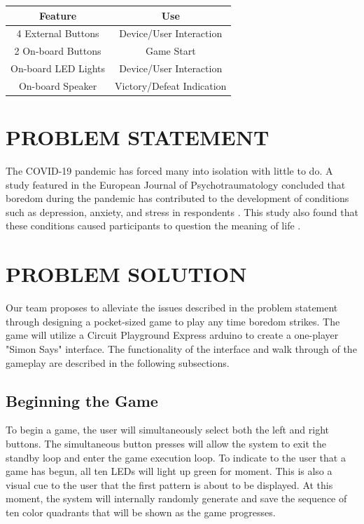 \documentclass[12pt]{article}
\begin{document}
\begin{center}
\begin{tabular}{|c|c|}
    \hline
    Feature & Use \\
    \hline
    \hline
    4 External Buttons & Device/User Interaction\\
    2 On-board Buttons & Game Start\\
    On-board LED Lights & Device/User Interaction\\
    On-board Speaker & Victory/Defeat Indication\\
    \hline
\end{tabular}
\end{center}


\section{PROBLEM STATEMENT}
The COVID-19 pandemic has forced many into isolation with little to do. A study featured in the European Journal of Psychotraumatology concluded that boredom during the pandemic has contributed to the development of conditions such as depression, anxiety, and stress in respondents \cite{Chao}. This study also found that these conditions caused participants to question the meaning of life \cite{Chao}. 

\section{PROBLEM SOLUTION}

Our team proposes to alleviate the issues described in the problem statement through designing a pocket-sized game to play any time boredom strikes. The game will utilize a Circuit Playground Express arduino to create a one-player "Simon Says" interface. The functionality of the interface and walk through of the gameplay are described in the following subsections.

\subsection{Beginning the Game}
To begin a game, the user will simultaneously select both the left and right buttons. The simultaneous button presses will allow the system to exit the standby loop and enter the game execution loop. To indicate to the user that a game has begun, all ten LEDs will light up green for moment. This is also a visual cue to the user that the first pattern is about to be displayed. At this moment, the system will internally randomly generate and save the sequence of ten color quadrants that will be shown as the game progresses.
\end{document}

